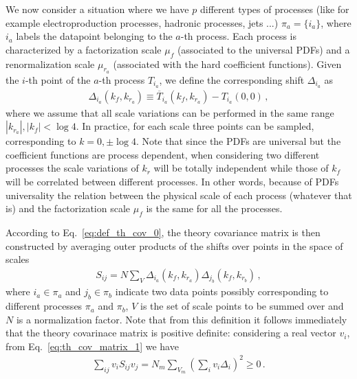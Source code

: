 %
We now consider a situation where we have $p$ different types of processes (like for example electroproduction processes, 
hadronic processes, jets ...) $\pi_a = \{i_a\}$, where $i_a$ labels the datapoint belonging to the $a$-th process.
Each process is characterized by a factorization scale $\mu_f$ (associated to the universal PDFs) and a renormalization scale 
$\mu_{r_a}$ (associated with the hard coefficient functions).
Given the $i$-th point of the $a$-th process $T_{i_a}$, we define the corresponding shift $\Delta_{i_a}$ as 
\begin{align}
    \Delta_{i_a}\left(k_f,k_{r_a}\right) \equiv \overline{T}_{i_a}\left(k_f, k_{r_a}\right) - T_{i_a}\left(0, 0\right)\,,
\end{align}
where we assume that all scale variations can be performed in the same range $|k_{r_a}|, |k_f| < \log 4$.
In practice, for each scale three points can be sampled, corresponding to $k = 0, \pm \log 4$.
Note that since the PDFs are universal but the coefficient functions are process dependent,
when considering two different processes the scale variations of $k_{r}$ will be totally independent 
while those of $k_f$ will be correlated between different processes. 
In other words, because of PDFs universality the relation between the physical scale of each process (whatever that is)
and the factorization scale $\mu_f$ is the same for all the processes.

According to Eq.~\ref{eq:def_th_cov_0}, the theory covariance matrix is then constructed by averaging
outer products of the shifts over points in the space of scales 
\begin{align}
    \label{eq:th_cov_matrix_1}
    S_{ij} = N \sum_V \Delta_{i_a}\left(k_f,k_{r_a}\right) \Delta_{j_b}\left(k_f,k_{r_b}\right)\,,
\end{align} 
where $i_a \in \pi_a$ and $j_b \in \pi_b$ indicate two data points possibly corresponding to different
processes $\pi_a$ and $\pi_b$, $V$ is the set of scale points to be summed over and $N$ is a normalization factor.
Note that from this definition it follows immediately that the
theory covarinace matrix is positive definite: considering a real vector $v_i$, from Eq.~\ref{eq:th_cov_matrix_1}
we have
\begin{align}
    \sum_{ij} v_i S_{ij} v_j = N_m \sum_{V_m}\left(\sum_i v_i \Delta_i\right)^2 \geq 0\,.
\end{align}



